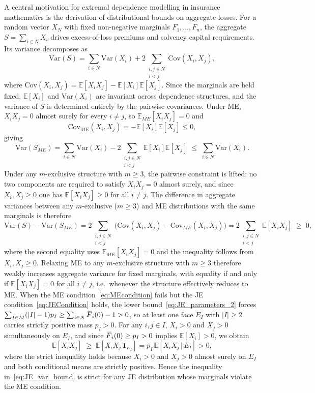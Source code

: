 \documentclass[letterpaper,12pt]{article}
\def \E {\mathbb{E}}
\numberwithin{equation}{section}
\newcommand{\N}{{N}}
\newcommand{\M}{{M}}
\newcommand{\I}{{I}}
\newcommand{\F}{\,\overline{\kern-0.175em F\kern-0em}}
\begin{document}
{A central motivation for extremal dependence modelling in insurance
mathematics is the derivation of distributional bounds on aggregate losses.
For a random vector $X_\N$ with fixed non-negative marginals $F_1,\dots,F_n$,
the aggregate $S=\sum_{i\in\N}X_i$ drives excess-of-loss premiums and
solvency capital requirements. Its variance decomposes as
\[
\mathrm{Var}(S)
=\sum_{i\in\N}\mathrm{Var}(X_i)
+2\!\sum_{\substack{i,j\in\N\\i<j}}\!\mathrm{Cov}(X_i,X_j),
\]
where $\mathrm{Cov}(X_i,X_j)=\E[X_iX_j]-\E[X_i]\E[X_j]$. Since the marginals
are held fixed, $\E[X_i]$ and $\mathrm{Var}(X_i)$ are invariant across
dependence structures, and the variance of $S$ is determined entirely by the
pairwise covariances. Under ME, $X_iX_j=0$ almost surely for every $i\ne j$,
so $\E_{ME}[X_iX_j]=0$ and
\[
\mathrm{Cov}_{ME}(X_i,X_j)=-\E[X_i]\E[X_j]\le 0,
\]
giving
\[
\mathrm{Var}(S_{ME})
=\sum_{i\in\N}\mathrm{Var}(X_i)
-2\!\sum_{\substack{i,j\in\N\\i<j}}\!\E[X_i]\E[X_j]
\;\le\;\sum_{i\in\N}\mathrm{Var}(X_i).
\]
Under any $m$-exclusive structure with $m\ge3$, the pairwise constraint is
lifted: no two components are required to satisfy $X_iX_j=0$ almost surely,
and since $X_i,X_j\ge0$ one has $\E[X_iX_j]\ge0$ for all $i\ne j$. The
difference in aggregate variances between any $m$-exclusive ($m\ge3$) and
ME distributions with the same marginals is therefore
\begin{equation}
\label{eq:JE_var_bound}
\mathrm{Var}(S)-\mathrm{Var}(S_{ME})
=2\!\sum_{\substack{i,j\in\N\\i<j}}\!
\bigl(\mathrm{Cov}(X_i,X_j)-\mathrm{Cov}_{ME}(X_i,X_j)\bigr)
=2\!\sum_{\substack{i,j\in\N\\i<j}}\!\E[X_iX_j]\;\ge\;0,
\end{equation}
where the second equality uses $\E_{ME}[X_iX_j]=0$ and the inequality
follows from $X_i,X_j\ge0$. Relaxing ME to any $m$-exclusive structure with
$m\ge3$ therefore weakly increases aggregate variance for fixed marginals,
with equality if and only if $\E[X_iX_j]=0$ for all $i\ne j$, i.e.\ whenever
the structure effectively reduces to ME. When the ME
condition~\eqref{eq:MEcondition} fails but the JE
condition~\eqref{eq:JECondition} holds, the lower
bound~\eqref{eq:JE_parameters_2} forces
$\sum_{\I\in\M}(|\I|-1)p_\I\ge\sum_{i\in\N}\F_i(0)-1>0$, so at least one
face $E_\I$ with $|\I|\ge2$ carries strictly positive mass $p_\I>0$. For
any $i,j\in\I$, $X_i>0$ and $X_j>0$ simultaneously on $E_\I$, and since
$\F_i(0)\ge p_\I>0$ implies $\E[X_i]>0$, we obtain
\[
\E[X_iX_j]
\;\ge\;\E\!\left[X_iX_j\,\mathbf{1}_{E_\I}\right]
=p_\I\,\E\!\left[X_iX_j\,\big|\,E_\I\right]>0,
\]
where the strict inequality holds because $X_i>0$ and $X_j>0$ almost surely
on $E_\I$ and both conditional means are strictly positive. Hence the
inequality in~\eqref{eq:JE_var_bound} is strict for any JE distribution
whose marginals violate the ME condition.

}
\end{document}
